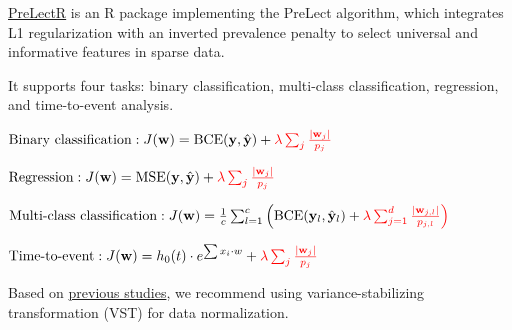 \documentclass[
]{article}
\newenvironment{Shaded}{\begin{snugshade}}{\end{snugshade}}
\newcommand{\AttributeTok}[1]{\textcolor[rgb]{0.13,0.29,0.53}{#1}}
\newcommand{\CommentTok}[1]{\textcolor[rgb]{0.56,0.35,0.01}{\textit{#1}}}
\newcommand{\DecValTok}[1]{\textcolor[rgb]{0.00,0.00,0.81}{#1}}
\newcommand{\FunctionTok}[1]{\textcolor[rgb]{0.13,0.29,0.53}{\textbf{#1}}}
\newcommand{\NormalTok}[1]{#1}
\newcommand{\OtherTok}[1]{\textcolor[rgb]{0.56,0.35,0.01}{#1}}
\newcommand{\SpecialCharTok}[1]{\textcolor[rgb]{0.81,0.36,0.00}{\textbf{#1}}}
\newcommand{\StringTok}[1]{\textcolor[rgb]{0.31,0.60,0.02}{#1}}
\begin{document}
\href{https://github.com/YinchengChen23/PreLectR}{PreLectR} is an R
package implementing the PreLect algorithm, which integrates L1
regularization with an inverted prevalence penalty to select universal
and informative features in sparse data.

It supports four tasks: binary classification, multi-class
classification, regression, and time-to-event analysis.

\(\text{Binary classification} : J(\mathbf{w}) = \text{BCE}(\mathbf{y}, \hat{\mathbf{y}}) + \color{red}{\lambda \sum_j \frac{|\mathbf{w}_j|}{p_j}}\)

\(\text{Regression} : J(\mathbf{w}) = \text{MSE}(\mathbf{y}, \hat{\mathbf{y}}) + \color{red}{\lambda \sum_j \frac{|\mathbf{w}_j|}{p_j}}\)

\(\text{Multi-class classification} : J(\mathbf{w}) = \frac{1}{c} \sum_{l=1}^{c} \left( \text{BCE}(\mathbf{y}_l, \hat{\mathbf{y}}_l) + \color{red}{\lambda \sum_{j=1}^{d}\frac{|\mathbf{w}_{j,l}|}{p_{j,l}}} \right)\)

\(\text{Time-to-event} : J(\mathbf{w}) = h_0(t) \cdot e^{\sum{x_i \cdot w}}+ \color{red}{\lambda \sum_j \frac{|\mathbf{w}_j|}{p_j}}\)

Based on
\href{https://www.nature.com/articles/s41467-021-23821-6}{previous
studies}, we recommend using variance-stabilizing transformation (VST)
for data normalization.

\begin{Shaded}
\end{Shaded}
\end{document}
